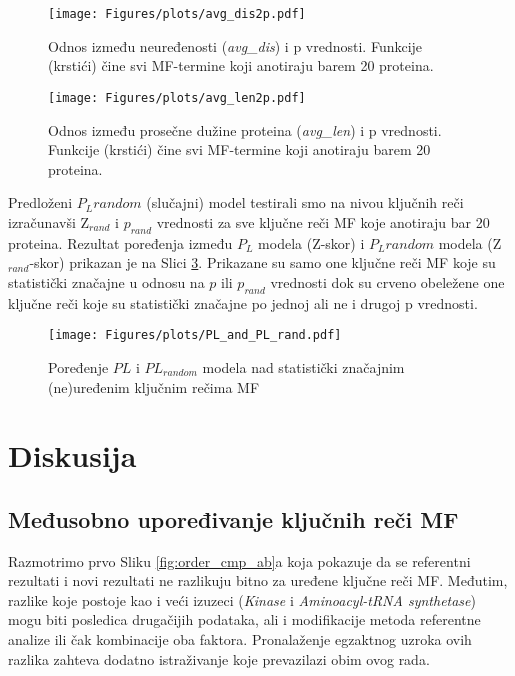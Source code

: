 \begin{figure}[th]
  \centering
\texttt{[image: Figures/plots/avg\_dis2p.pdf]}
\caption {
  Odnos između neuređenosti (\textit{avg\_dis}) i p vrednosti.
  Funkcije (krstići) čine svi MF-termine koji anotiraju barem 20 proteina.
}
\label{fig:avg_dis_vs_p}
\end{figure}

\begin{figure}[th]
  \centering
\texttt{[image: Figures/plots/avg\_len2p.pdf]}
\caption {
  Odnos između prosečne dužine proteina (\textit{avg\_len}) i p vrednosti.
  Funkcije (krstići) čine svi MF-termine koji anotiraju barem 20 proteina.
}
\label{fig:avg_len_vs_p}
\end{figure}



Predloženi $P_L random$ (slučajni) model testirali smo na nivou ključnih reči
izračunavši Z$_{rand}$ i  $p_{rand}$ vrednosti za sve ključne reči MF koje
anotiraju bar 20 proteina. Rezultat poređenja između $P_L$
modela (Z-skor) i $P_L random$ modela (Z$_{rand}$-skor) prikazan je na Slici
\ref{fig:PLrand}. Prikazane su samo one ključne reči MF koje su statistički
značajne u odnosu na $p$ ili $p_{rand}$ vrednosti dok su crveno obeležene one
ključne reči koje su statistički značajne po jednoj ali ne i drugoj p
vrednosti.


\begin{figure}[th]
\hspace*{-2.7cm} 
\centering
\texttt{[image: Figures/plots/PL\_and\_PL\_rand.pdf]}
\caption {
  Poređenje $PL$ i $PL_{random}$ modela nad statistički značajnim (ne)uređenim ključnim rečima MF
}
\label{fig:PLrand}
\end{figure}




\chapter{Diskusija} %

\label{Diskusija} %

\section{Međusobno upoređivanje ključnih reči MF}

Razmotrimo prvo Sliku \ref{fig:order_cmp_ab}a koja pokazuje da se referentni
rezultati i novi rezultati ne razlikuju bitno za uređene ključne
reči MF. Međutim, razlike koje postoje kao i veći izuzeci (\textit{Kinase} i
\textit{Aminoacyl-tRNA synthetase})  mogu biti posledica drugačijih podataka,
ali i modifikacije metoda referentne analize ili čak kombinacije oba faktora.
Pronalaženje egzaktnog uzroka ovih razlika zahteva dodatno istraživanje koje
prevazilazi obim ovog rada.


